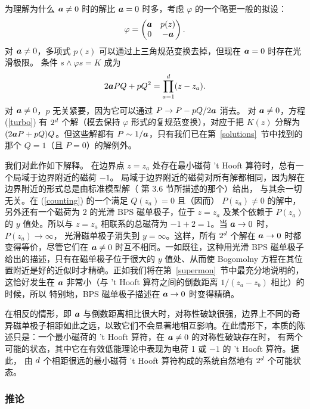 为理解为什么 $\ca\not=0$ 时的解比 $\ca=0$ 时多，考虑 $\varphi$ 的一个略更一般的拟设：
\begin{equation}\label{pony}\varphi=\begin{pmatrix} \ca & p(z)\cr 0 & -\ca\end{pmatrix}.
\end{equation}
对 $\ca\not=0$，多项式 $p(z)$ 可以通过上三角规范变换去掉，但现在 $\ca=0$ 时存在光滑极限。
 条件 $s\wedge \varphi s=K$ 成为
\begin{equation}\label{turbo}  2\ca PQ+pQ^2 = \prod_{a=1}^\ss(z-z_a).\end{equation}
对 $\ca\not=0$，$p$ 无关紧要，因为它可以通过 $P\to P-pQ/2\ca$ 消去。
对 $\ca\not=0$，方程 (\ref{turbo}) 有 $2^\ss$ 个解（模去保持 $\varphi$ 形式的复规范变换），对应于把 $K(z)$ 分解为 $(2\ca P+pQ)Q$。但这些解都有 $P\sim 1/\ca$，只有我们已在第~\ref{solutions}~节中找到的那个 $Q=1$（且 $P=0$）的解例外。

我们对此作如下解释。
在边界点 $z=z_a$ 处存在最小磁荷 't Hooft 算符时，总有一个局域于边界附近的磁荷 $-1$。
局域于边界附近的磁荷对所有解都相同，因为解在边界附近的形式总是由标准模型解（\cite{fiveknots} 第 3.6 节所描述的那个）给出，
与其余一切无关。在 (\ref{counting}) 的一个满足 $Q(z_a)=0$ 且（因而）
$P(z_a)\not=0$ 的解中，另外还有一个磁荷为 $2$ 的光滑 BPS 磁单极子，位于
$z=z_a$ 及某个依赖于 $P(z_a)$ 的 $y$ 值处。所以与 $z=z_a$ 相联系的总磁荷为 $-1+2=1$。当 $\ca\to 0$ 时，$P(z_a)\to\infty$，
光滑磁单极子消失到 $y=\infty$。这样，所有 $2^\ss$ 个解在 $\ca\to 0$ 时都变得等价，尽管它们在 $\ca\not=0$ 时互不相同。一如既往，这种用光滑 BPS 磁单极子给出的描述，只有在磁单极子位于很大的 $y$ 值处、从而使 Bogomolny 方程在其位置附近是好的近似时才精确。正如我们将在第~\ref{supermon}~节中最充分地说明的，这恰好发生在 $\ca$ 非常小（与 't Hooft 算符之间的倒数距离 $1/(z_a-z_b)$ 相比）的时候，所以
特别地，BPS 磁单极子描述在 $\ca\to 0$ 时变得精确。

在相反的情形，即 $\ca$ 与倒数距离相比很大时，对称性破缺很强，边界上不同的奇异磁单极子相距如此之远，以致它们不会显著地相互影响。在此情形下，本质的陈述只是：一个最小磁荷的 't Hooft 算符，在 $\ca\not=0$ 的对称性破缺存在时，
有两个可能的状态，其中它在有效低能理论中表现为电荷 1 或 $-1$ 的 't Hooft 算符。据此，
由 $\ss$ 个相距很远的最小磁荷 't Hooft 算符构成的系统自然地有 $2^\ss$ 个可能状态。


\subsubsection{推论}\label{physhilb}

